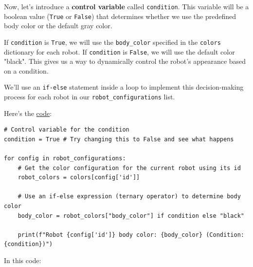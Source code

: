 Now, let's introduce a \textbf{control variable} called \texttt{condition}. This variable will be a boolean value (\texttt{True} or \texttt{False}) that determines whether we use the predefined body color or the default gray color.

If \texttt{condition} is \texttt{True}, we will use the \texttt{body\_color} specified in the \texttt{colors} dictionary for each robot. If \texttt{condition} is \texttt{False}, we will use the default color "black". This gives us a way to dynamically control the robot's appearance based on a condition.

We'll use an \texttt{if-else} statement inside a loop to implement this decision-making process for each robot in our \texttt{robot\_configurations} list.

Here's the \href{https://github.com/balandongiv/computer_programming_gist/blob/main/session3/condition_block.py}{code}:
\begin{verbatim}
# Control variable for the condition
condition = True # Try changing this to False and see what happens

for config in robot_configurations:
    # Get the color configuration for the current robot using its id
    robot_colors = colors[config['id']]
    
    # Use an if-else expression (ternary operator) to determine body color
    body_color = robot_colors["body_color"] if condition else "black"
    
    print(f"Robot {config['id']} body color: {body_color} (Condition: {condition})")
\end{verbatim}

In this code:

